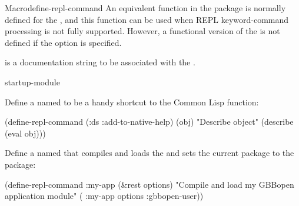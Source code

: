 \documentclass[10pt,twoside,english,pdftex]{article}
\begin{document}
\begin{functiondoc}{Macro}{define-repl-command}{%
    }
An equivalent function in the  package is
normally defined for the  ,
and this function can be used when REPL keyword-command processing is not
fully supported.  However, a  functional
version of the  is not defined if the
 option is specified.

 is a documentation string to be associated
with the  .

\begin{alsos}{startup-module}
\end{alsos}

\fnexamples
Define a  named  to be a handy
shortcut to the Common Lisp  function:
%
\W\supp
\begin{example}
  (define-repl-command (:ds :add-to-native-help) (obj)
    "Describe object"
    (describe (eval obj)))
\end{example}

Define a  named  that compiles and
loads the   and sets the current package to
the  package:
%
\W\supp
\begin{example}
  (define-repl-command :my-app (&rest options)
    "Compile and load my GBBopen application module"
    ( :my-app options :gbbopen-user))
\end{example} 

\end{functiondoc}

\end{document}
